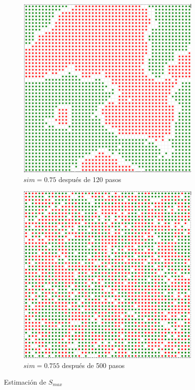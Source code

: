 \documentclass{article}
\begin{document}
\begin{figure}
  \centering
  \begin{subfigure}{0.4\textwidth}
    \includegraphics[width=\textwidth]{imgs/conv_state75.png}
    \caption{$sim=0.75$ después de 120 pasos}
    \label{fig:sim75}
  \end{subfigure}
  \quad
  \begin{subfigure}{0.4\textwidth}
    \includegraphics[width=\textwidth]{imgs/sim755.png}
    \caption{$sim=0.755$ después de 500 pasos}
    \label{fig:sim755}
  \end{subfigure}
  \caption{Estimación de $S_{max}$}
  \label{fig:sim-max}
\end{figure}
\end{document}
